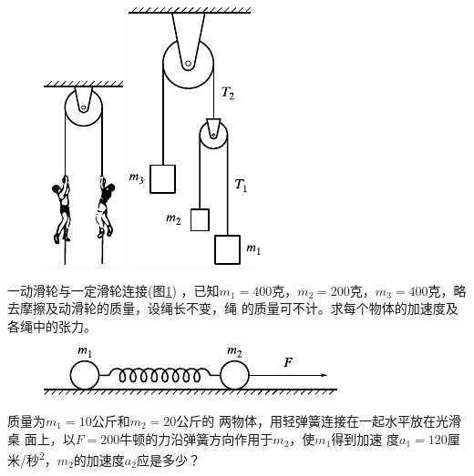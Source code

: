 \begin{exercises}
\begin{figure}[h]
  \begin{minipage}[b]{0.4\linewidth}
    \centering
    \includegraphics{figure/fig03.30}
    \caption{}
    \label{fig:03.30}
  \end{minipage}
  \begin{minipage}[b]{0.6\linewidth}
    \centering
    \includegraphics{figure/fig03.31}
    \caption{}
    \label{fig:03.31}
  \end{minipage}
  \vspace{-1.56em}
\end{figure}
\exercise 一动滑轮与一定滑轮连接(图\ref{fig:03.31}) ，已知$  m _ { 1 } = 4 0 0  $克，$  m _ { 2 } = 2 0 0  $克，$  m _ { 3 } = 4 0 0  $克，略去摩擦及动滑轮的质量，设绳长不变，绳
的质量可不计。求每个物体的加速度及各绳中的张力。

\begin{figure}
  \centering
  \includegraphics{figure/fig03.32}
  \caption{}
  \label{fig:03.32}
\end{figure}
\exercise 质量为$  m _ { 1 } = 1 0  $公斤和$  m _ { 2 } = 2 0  $公斤的
两物体，用轻弹簧连接在一起水平放在光滑桌
面上，以$  F = 2 0 0  $牛顿的力沿弹簧方向作用于$  m _ { 2 }  $，使$  m _ { 1 }  $得到加速
度$  a _ { 1 } = 1 2 0 $厘米/秒\textsuperscript{2}，$  m _ { 2 }  $的加速度$  a _ { 2 }  $应是多少？


\end{exercises}
